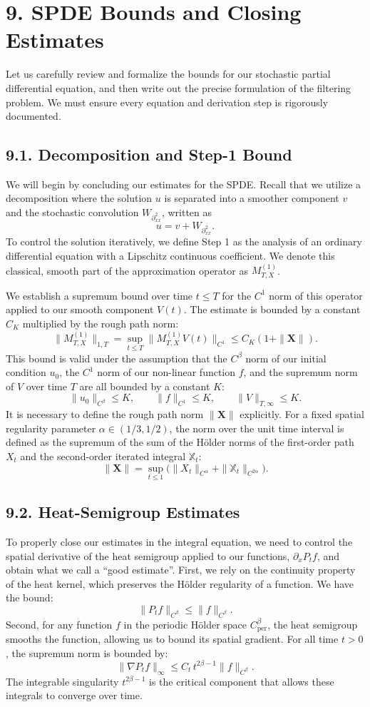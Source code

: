 \documentclass[11pt]{article}
\theoremstyle{definition}
\theoremstyle{remark}
\begin{document}
\section*{9. SPDE Bounds and Closing Estimates}
Let us carefully review and formalize the bounds for our stochastic partial differential equation, and then write out the precise formulation of the filtering problem. We must ensure every equation and derivation step is rigorously documented.

\subsection*{9.1. Decomposition and Step-1 Bound}
We will begin by concluding our estimates for the SPDE. Recall that we utilize a decomposition where the solution $u$ is separated into a smoother component $v$ and the stochastic convolution $W_{\partial_{xx}^{2}}$, written as
\[
u=v+W_{\partial_{xx}^{2}}.
\]
To control the solution iteratively, we define Step 1 as the analysis of an ordinary differential equation with a Lipschitz continuous coefficient. We denote this classical, smooth part of the approximation operator as $M^{(1)}_{T,X}$.

We establish a supremum bound over time $t\le T$ for the $C^1$ norm of this operator applied to our smooth component $V(t)$. The estimate is bounded by a constant $C_K$ multiplied by the rough path norm:
\[
\|M^{(1)}_{T,X}\|_{1,T}
=
\sup_{t\le T}\|M^{(1)}_{T,X}V(t)\|_{C^1}
\le
C_K(1+\|\mathbf X\|).
\]
This bound is valid under the assumption that the $C^\beta$ norm of our initial condition $u_0$, the $C^1$ norm of our non-linear function $f$, and the supremum norm of $V$ over time $T$ are all bounded by a constant $K$:
\[
\|u_0\|_{C^\beta}\le K,\qquad
\|f\|_{C^1}\le K,\qquad
\|V\|_{T,\infty}\le K.
\]
It is necessary to define the rough path norm $\|\mathbf X\|$ explicitly. For a fixed spatial regularity parameter $\alpha\in(1/3,1/2)$, the norm over the unit time interval is defined as the supremum of the sum of the H\"older norms of the first-order path $X_t$ and the second-order iterated integral $\mathbb X_t$:
\[
\|\mathbf X\|
=
\sup_{t\le1}\bigl(\|X_t\|_{C^\alpha}+\|\mathbb X_t\|_{C^{2\alpha}}\bigr).
\]

\subsection*{9.2. Heat-Semigroup Estimates}
To properly close our estimates in the integral equation, we need to control the spatial derivative of the heat semigroup applied to our functions, $\partial_xP_tf$, and obtain what we call a ``good estimate''.
First, we rely on the continuity property of the heat kernel, which preserves the H\"older regularity of a function. We have the bound:
\[
\|P_tf\|_{C^\beta}\le\|f\|_{C^\beta}.
\]
Second, for any function $f$ in the periodic H\"older space $C^\beta_{\mathrm{per}}$, the heat semigroup smooths the function, allowing us to bound its spatial gradient. For all time $t>0$, the supremum norm is bounded by:
\[
\|\nabla P_tf\|_{\infty}
\le
C_t\,t^{2\beta-1}\|f\|_{C^\beta}.
\]
The integrable singularity $t^{2\beta-1}$ is the critical component that allows these integrals to converge over time.
\end{document}
